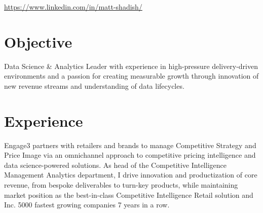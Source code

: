 \documentclass[]{deedy-resume-openfont}
\begin{document}
%
%

%
%



\href{https://www.linkedin.com/in/matt-shadish/}{https://www.linkedin.com/in/matt-shadish/}

\begin{comment}
\begin{center}
\huge\color{subheadings}\custombold{LIFELONG LEARNER}
\end{center}
\end{comment}


\section{Objective}
\begin{flushleft}
Data Science \& Analytics Leader with experience in high-pressure delivery-driven environments and a passion for creating measurable growth through innovation of new revenue streams and understanding of data lifecycles.
\end{flushleft}



\section{Experience}


\sectionsep





\sectionsep
Engage3 partners with retailers and brands to manage Competitive Strategy and Price Image via an omnichannel approach to competitive pricing intelligence and data science-powered solutions.  As head of the Competitive Intelligence Management Analytics department, I drive innovation and productization of core revenue, from bespoke deliverables to turn-key products, while maintaining market position as the best-in-class Competitive Intelligence Retail solution and Inc. 5000 fastest growing companies 7 years in a row.
\end{document}
